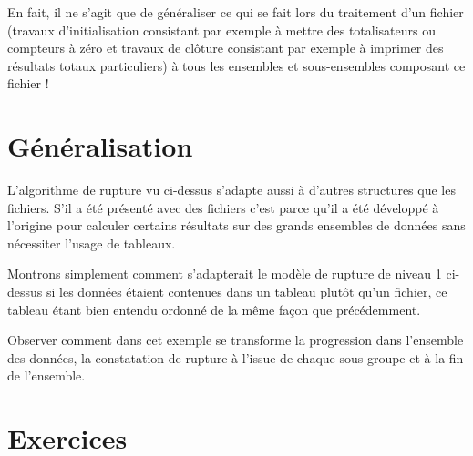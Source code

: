 En fait, il ne s’agit que de généraliser ce qui se fait lors du
traitement d’un fichier (travaux d’initialisation consistant par
exemple à mettre des totalisateurs ou compteurs à zéro et travaux de
clôture consistant par exemple à imprimer des résultats totaux
particuliers) à tous les ensembles et sous-ensembles composant ce
fichier !


\section{Généralisation}

L’algorithme de rupture vu ci-dessus s’adapte aussi à d’autres
structures que les fichiers. S’il a été présenté avec des fichiers
c’est parce qu’il a été développé à l’origine pour calculer certains
résultats sur des grands ensembles de données sans nécessiter l’usage
de tableaux. 

Montrons simplement comment s’adapterait le modèle de rupture de niveau
1 ci-dessus si les données étaient contenues dans un tableau plutôt
qu’un fichier, ce tableau étant bien entendu ordonné de la même façon
que précédemment.


Observer comment dans cet exemple se transforme la progression dans
l’ensemble des données, la constatation de rupture à l’issue de chaque
sous-groupe et à la fin de l’ensemble.


\section{Exercices}

